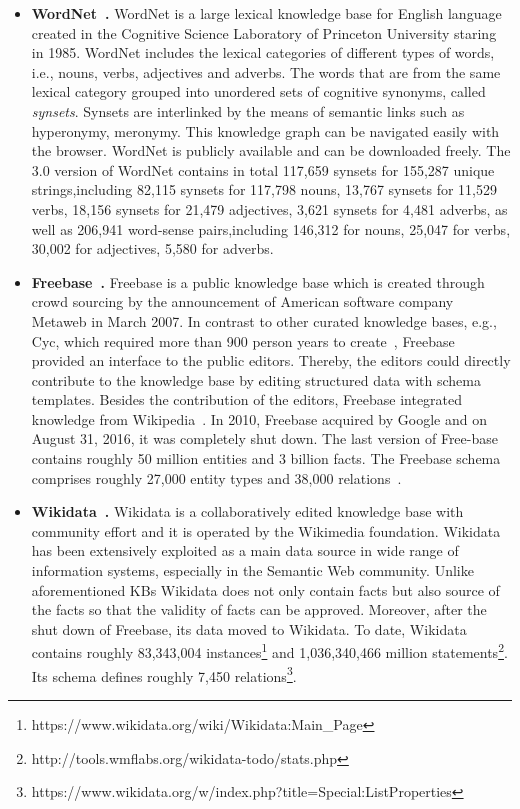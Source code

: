 \begin{itemize}
\item \textbf{WordNet~\cite{fellbaum98wordnet}.} WordNet is a large lexical knowledge base for English language created in the Cognitive Science Laboratory of Princeton University staring in 1985. WordNet includes the lexical categories of different types of words, i.e., nouns, verbs, adjectives and adverbs. The words that are from the same lexical category grouped into unordered sets of cognitive synonyms, called \textit{synsets}. Synsets are interlinked by the means of semantic links such as hyperonymy, meronymy. This knowledge graph can be navigated easily with the browser. WordNet is publicly available and can be downloaded freely. The 3.0 version of WordNet contains in total 117,659 synsets for 155,287 unique strings,including 82,115 synsets for 117,798 nouns, 13,767 synsets for 11,529 verbs, 18,156 synsets for 21,479 adjectives, 3,621 synsets for 4,481 adverbs, as well as 206,941 word-sense pairs,including 146,312 for nouns, 25,047 for verbs, 30,002 for adjectives, 5,580 for adverbs.\\

\item \textbf{Freebase~\cite{DBLP:conf/sigmod/BollackerEPST08}.} Freebase is a public knowledge base which is created through crowd sourcing by the announcement of American software company Metaweb in March 2007. In contrast to other curated knowledge bases, e.g., Cyc, which required more than 900 person years to create~\cite{DBLP:journals/semweb/Paulheim17}, Freebase provided an interface to the public editors.  Thereby, the editors could directly contribute to the knowledge base by editing structured data with schema templates. Besides the contribution of the editors, Freebase integrated knowledge  from Wikipedia~\cite{farber2015comparative}. In 2010, Freebase acquired by Google and on August 31, 2016, it was completely shut down. The last version of Free-base contains roughly 50 million entities and 3 billion facts. The Freebase schema comprises roughly 27,000 entity types and 38,000 relations~\cite{DBLP:journals/semweb/Paulheim17}.\\

\item \textbf{Wikidata~\cite{DBLP:journals/cacm/VrandecicK14}.} Wikidata is a collaboratively edited knowledge base with community effort and it is operated by the Wikimedia foundation. Wikidata has been extensively exploited as a main data source in wide range of information systems, especially in the Semantic Web community. Unlike aforementioned KBs Wikidata does not only contain facts but also source of the facts so that the validity of facts can be approved. Moreover, after the shut down of Freebase, its data moved to Wikidata. To date, Wikidata contains roughly 83,343,004 instances\footnote{https://www.wikidata.org/wiki/Wikidata:Main_Page} and 1,036,340,466 million statements\footnote{http://tools.wmflabs.org/wikidata-todo/stats.php}. Its schema defines roughly 7,450 relations\footnote{https://www.wikidata.org/w/index.php?title=Special:ListProperties}.\\


\end{itemize}

